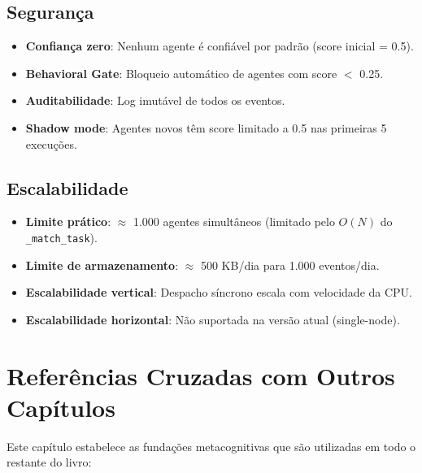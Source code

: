 \subsection{Segurança}

\begin{itemize}
    \item \textbf{Confiança zero}: Nenhum agente é confiável por padrão (score inicial = 0.5).
    \item \textbf{Behavioral Gate}: Bloqueio automático de agentes com score $<$ 0.25.
    \item \textbf{Auditabilidade}: Log imutável de todos os eventos.
    \item \textbf{Shadow mode}: Agentes novos têm score limitado a 0.5 nas primeiras 5 execuções.
\end{itemize}

\subsection{Escalabilidade}

\begin{itemize}
    \item \textbf{Limite prático}: $\approx$ 1.000 agentes simultâneos (limitado pelo $O(N)$ do \texttt{\_match\_task}).
    \item \textbf{Limite de armazenamento}: $\approx$ 500 KB/dia para 1.000 eventos/dia.
    \item \textbf{Escalabilidade vertical}: Despacho síncrono escala com velocidade da CPU.
    \item \textbf{Escalabilidade horizontal}: Não suportada na versão atual (single-node).
\end{itemize}

\section{Referências Cruzadas com Outros Capítulos}
\label{sec:cross-refs}

Este capítulo estabelece as fundações metacognitivas que são utilizadas em todo o restante do livro:


